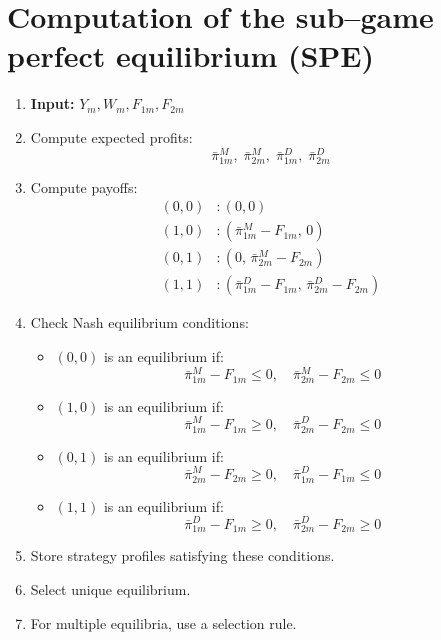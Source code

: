 \documentclass[12pt]{article}
\begin{document}
\section{Computation of the sub--game perfect equilibrium (SPE)}
\begin{enumerate}
\item \textbf{Input:} $Y_m, W_m, F_{1m}, F_{2m}$

\item Compute expected profits:
\[
\bar{\pi}_{1m}^M,\; \bar{\pi}_{2m}^M,\; \bar{\pi}_{1m}^D,\; \bar{\pi}_{2m}^D
\]

\item Compute payoffs:
\begin{align*}
(0,0) &: (0,0) \\
(1,0) &: (\bar{\pi}_{1m}^M - F_{1m},\,0) \\
(0,1) &: (0,\,\bar{\pi}_{2m}^M - F_{2m}) \\
(1,1) &: (\bar{\pi}_{1m}^D - F_{1m},\,\bar{\pi}_{2m}^D - F_{2m})
\end{align*}

\item Check Nash equilibrium conditions:

\begin{itemize}
\item $(0,0)$ is an equilibrium if:
\[
\bar{\pi}_{1m}^M - F_{1m} \leq 0, \quad
\bar{\pi}_{2m}^M - F_{2m} \leq 0
\]

\item $(1,0)$ is an equilibrium if:
\[
\bar{\pi}_{1m}^M - F_{1m} \geq 0, \quad
\bar{\pi}_{2m}^D - F_{2m} \leq 0
\]

\item $(0,1)$ is an equilibrium if:
\[
\bar{\pi}_{2m}^M - F_{2m} \geq 0, \quad
\bar{\pi}_{1m}^D - F_{1m} \leq 0
\]

\item $(1,1)$ is an equilibrium if:
\[
\bar{\pi}_{1m}^D - F_{1m} \geq 0, \quad
\bar{\pi}_{2m}^D - F_{2m} \geq 0
\]
\end{itemize}

\item Store strategy profiles satisfying these conditions.

\item Select unique equilibrium.

\item For multiple equilibria, use a selection rule.
\end{enumerate}
\end{document}
